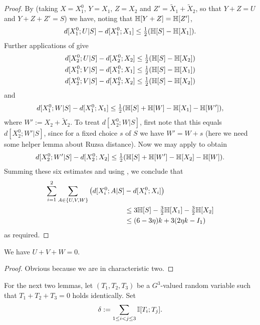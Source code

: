 \begin{proof}
  \leanok
  By  (taking $X = X_1^0$, $Y = X_1$, $Z = X_2$ and $Z' = \tilde X_1 + \tilde X_2$, so that $Y + Z = U$ and $Y + Z + Z' = S$) we have, noting that $\mathbb{H}[Y+ Z] = \mathbb{H}[Z']$,
  \[
    d[X^0_1;U|S] - d[X^0_1;X_1] \leq \tfrac{1}{2} (\mathbb{H}[S] -  \mathbb{H}[X_1]).
  \]
  Further applications of  give
  \begin{align*}
  d[X^0_2;U|S] - d[X^0_2; X_2] &\leq \tfrac{1}{2} (\mathbb{H}[S] -  \mathbb{H}[X_2]) \\
  d[X^0_1;V|S] - d[X^0_1;X_1] &\leq \tfrac{1}{2} (\mathbb{H}[S] -  \mathbb{H}[X_1])\\
  d[X^0_2;V|S] - d[X^0_2;X_2] &\leq \tfrac{1}{2} (\mathbb{H}[S] -  \mathbb{H}[X_2])
  \end{align*}
  and
  \[d[X^0_1;W|S] - d[X^0_1;X_1] \leq \tfrac{1}{2} (\mathbb{H}[S] + \mathbb{H}[W] - \mathbb{H}[X_1] - \mathbb{H}[W']),\] where $W' := X_2 + \tilde X_2$.
  To treat $d[X^0_2;W|S]$, first note that this equals $d[X^0_2;W'|S]$, since for a fixed choice $s$ of $S$ we have $W' = W + s$ (here we need some helper lemma about Ruzsa distance). Now we may apply  to obtain
  \[d[X^0_2;W'|S] - d[X^0_2;X_2] \leq \tfrac{1}{2} (\mathbb{H}[S] + \mathbb{H}[W'] - \mathbb{H}[X_2] - \mathbb{H}[W]).\]
  Summing these six estimates and using , we conclude that
  \begin{align*}
    \sum_{i=1}^2 \sum_{A\in\{U,V,W\}} \big(d[X^0_i;A|S] & - d[X^0_i;X_i]\big) \\
      &\leq 3 \mathbb{H}[S] - \tfrac{3}{2} \mathbb{H}[X_1] - \tfrac{3}{2} \mathbb{H}[X_2]\\
      &\leq (6 - 3\eta) k + 3(2 \eta k - I_1)
  \end{align*}
  as required.
\end{proof}

\begin{lemma}\label{key-ident}
\leanok
We have $U+V+W=0$.
\end{lemma}

\begin{proof} \leanok Obvious because we are in characteristic two.
\end{proof}

For the next two lemmas, let $(T_1,T_2,T_3)$ be a $G^3$-valued random variable such that $T_1+T_2+T_3=0$ holds identically. Set
\begin{equation}\label{delta-t1t2t3-def}
  \delta := \sum_{1 \leq i < j \leq 3} \mathbb{I}[T_i;T_j].
\end{equation}

